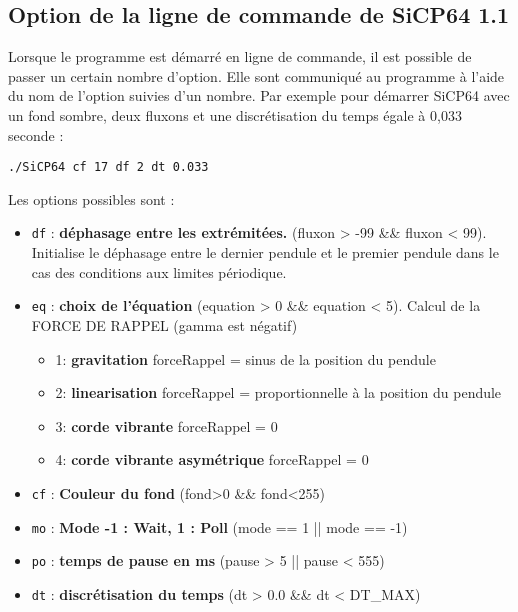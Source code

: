 \subsection{Option de la ligne de commande de SiCP64 1.1}
Lorsque le programme est démarré en ligne de commande, il est possible de passer un certain nombre d'option. Elle sont communiqué au programme à l'aide du nom de l'option suivies d'un nombre. Par exemple pour démarrer SiCP64 avec un fond sombre, deux fluxons et une discrétisation du temps égale à 0,033 seconde :
\begin{center}
\texttt{./SiCP64 cf 17 df 2 dt 0.033}
\end{center}
Les options possibles sont :
\begin{itemize}[leftmargin=2cm, label=, itemsep=3pt]
\item {\large \texttt{df}} : {\bf déphasage entre les extrémitées.} %
  (fluxon > -99 \&\& fluxon < 99). Initialise le déphasage entre le dernier pendule et le premier pendule dans le cas des conditions aux limites périodique.
\item {\large \texttt{eq}} : {\bf choix de l'équation} %
  (equation > 0 \&\& equation < 5).  Calcul de la FORCE DE RAPPEL (gamma est négatif)
\begin{itemize}[leftmargin=1cm, label=, itemsep=0pt]
\item 1: {\bf gravitation} forceRappel = sinus de la position du pendule
\item 2: {\bf linearisation} forceRappel = proportionnelle à la position du pendule
\item 3: {\bf corde vibrante} forceRappel = 0
\item 4: {\bf corde vibrante asymétrique} forceRappel = 0
\end{itemize}
\item {\large \texttt{cf}} : {\bf Couleur du fond} %
  (fond>0 \&\& fond<255)
\item {\large \texttt{mo}} : {\bf Mode -1 : Wait, 1 : Poll} %
  (mode == 1 || mode == -1)
\item {\large \texttt{po}} : {\bf temps de pause en ms} %
  (pause > 5 || pause < 555)
\item {\large \texttt{dt}} : {\bf discrétisation du temps} %
  (dt > 0.0 \&\& dt < DT\_MAX)
\end{itemize}

